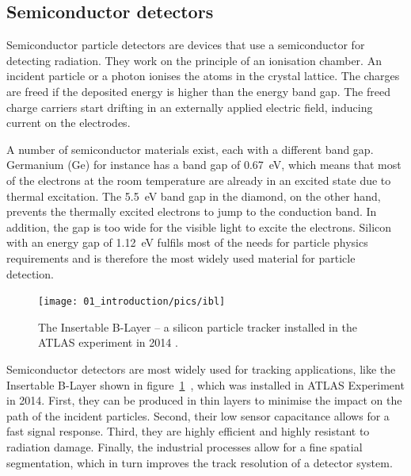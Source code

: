 

\subsection{Semiconductor detectors}
Semiconductor particle detectors are devices that use a semiconductor for detecting radiation. They work on the principle of an ionisation chamber. An incident particle or a photon ionises the atoms in the crystal lattice. The charges are freed if the deposited energy is higher than the energy band gap. The freed charge carriers start drifting in an externally applied electric field, inducing current on the electrodes. 

A number of semiconductor materials exist, each with a different band gap. Germanium (Ge) for instance has a band gap of 0.67~eV, which means that most of the electrons at the room temperature are already in an excited state due to thermal excitation. The 5.5~eV band gap in the diamond, on the other hand, prevents the thermally excited electrons to jump to the conduction band. In addition, the gap is too wide for the visible light to excite the electrons. Silicon with an energy gap of 1.12~eV fulfils most of the needs for particle physics requirements and is therefore the most widely used material for particle detection. 
\begin{figure}[!t]
\centering
\texttt{[image: 01\_introduction/pics/ibl]}
\caption{The Insertable B-Layer -- a silicon particle tracker installed in the ATLAS experiment in 2014 \cite{MarcelloniDeOliveira:1702006}.}
\label{fig:ibl}
\end{figure}

Semiconductor detectors are most widely used for tracking applications, like the Insertable B-Layer shown in figure~\ref{fig:ibl}~\cite{Pernegger:1985432}, which was installed in ATLAS Experiment in 2014. First, they can be produced in thin layers to minimise the impact on the path of the incident particles. Second, their low sensor capacitance allows for a fast signal response. Third, they are highly efficient and highly resistant to radiation damage. Finally, the industrial processes allow for a fine spatial segmentation, which in turn improves the track resolution of a detector system. 


